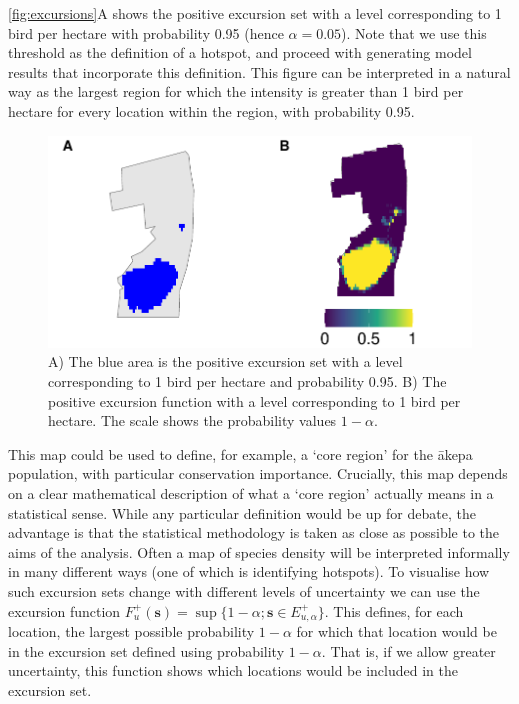 \documentclass{statsoc}
\newcommand{\bs}{\mathbf{s}}
\newcommand{\akepa}{\textquotesingle\={a}kepa}  %
\begin{document}
\autoref{fig:excursions}A shows the positive excursion set with a level corresponding to 1 bird per hectare with probability 0.95 (hence $\alpha = 0.05$).  Note that we use this threshold as the definition of a hotspot, and proceed with generating model results that incorporate this definition.  This figure can be interpreted in a natural way as the largest region for which the intensity is greater than 1 bird per hectare for every location within the region, with probability 0.95. 
\begin{figure}[!htb]
	\includegraphics{figures/excursions.pdf}
	\caption{A) The blue area is the positive excursion set with a level corresponding to 1 bird per hectare and probability 0.95.  B) The positive excursion function with a level corresponding to 1 bird per hectare.  The scale shows the probability values $1-\alpha$.}
	\label{fig:excursions}
\end{figure} 
This map could be used to define, for example, a `core region' for the \akepa{} population, with particular conservation importance.  Crucially, this map depends on a clear mathematical description of what a `core region' actually means in a statistical sense.  While any particular definition would be up for debate, the advantage is that the statistical methodology is taken as close as possible to the aims of the analysis.  Often a map of species density will be interpreted informally in many different ways (one of which is identifying hotspots).  To visualise how such excursion sets change with different levels of uncertainty we can use the excursion function $F_u^{+}(\bs) = \sup \{1 - \alpha ; \bs \in E_{u,\alpha}^+ \}$.  This defines, for each location, the largest possible probability $1 -\alpha$ for which that location would be in the excursion set defined using probability $1 - \alpha$.  That is, if we allow greater uncertainty, this function shows which locations would be included in the excursion set.    
\end{document}
